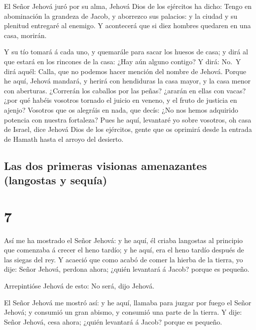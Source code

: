  El Señor Jehová juró por su alma, Jehová Dios de los
ejércitos ha dicho: Tengo en abominación la grandeza de Jacob, y
aborrezco sus palacios: y la ciudad y su plenitud entregaré al enemigo.
 Y acontecerá que si diez hombres quedaren en una casa,
morirán.

 Y su tío tomará á cada uno, y quemarále para sacar los
huesos de casa; y dirá al que estará en los rincones de la casa: ¿Hay
aún alguno contigo? Y dirá: No.~Y dirá aquél: Calla, que no podemos
hacer mención del nombre de Jehová.  Porque he aquí,
Jehová mandará, y herirá con hendiduras la casa mayor, y la casa menor
con aberturas.  ¿Correrán los caballos por las peñas?
¿ararán en ellas con vacas? ¿por qué habéis vosotros tornado el juicio
en veneno, y el fruto de justicia en ajenjo?  Vosotros
que os alegráis en nada, que decís: ¿No nos hemos adquirido potencia con
nuestra fortaleza?  Pues he aquí, levantaré yo sobre
vosotros, oh casa de Israel, dice Jehová Dios de los ejércitos, gente
que os oprimirá desde la entrada de Hamath hasta el arroyo del desierto.

\hypertarget{las-dos-primeras-visionas-amenazantes-langostas-y-sequuxeda}{%
\subsection{Las dos primeras visionas amenazantes (langostas y
sequía)}\label{las-dos-primeras-visionas-amenazantes-langostas-y-sequuxeda}}

\hypertarget{section-6}{%
\section{7}\label{section-6}}

 Así me ha mostrado el Señor Jehová: y he aquí, él criaba
langostas al principio que comenzaba á crecer el heno tardío; y he aquí,
era el heno tardío después de las siegas del rey.  Y
acaeció que como acabó de comer la hierba de la tierra, yo dije: Señor
Jehová, perdona ahora; ¿quién levantará á Jacob? porque es pequeño.

 Arrepintióse Jehová de esto: No será, dijo Jehová.

 El Señor Jehová me mostró así: y he aquí, llamaba para
juzgar por fuego el Señor Jehová; y consumió un gran abismo, y consumió
una parte de la tierra.  Y dije: Señor Jehová, cesa ahora;
¿quién levantará á Jacob? porque es pequeño.

